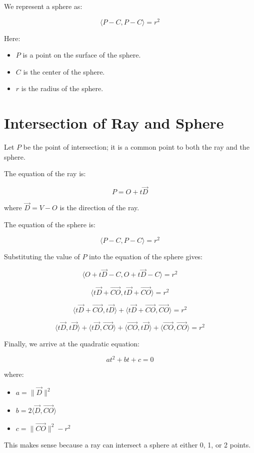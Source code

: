 \documentclass[conference]{IEEEtran}
\begin{document}
We represent a sphere as:

$$\langle P - C, P - C \rangle = r^2$$

Here:
\begin{itemize}
    \item $P$ is a point on the surface of the sphere.
    \item $C$ is the center of the sphere.
    \item $r$ is the radius of the sphere.
\end{itemize}


\section{Intersection of Ray and Sphere}

Let $P$ be the point of intersection; it is a common point to both the ray and the sphere.

The equation of the ray is:

$$P = O + t \vec{D}$$

where $\vec{D} = V - O$ is the direction of the ray.

The equation of the sphere is:

$$\langle P - C, P - C \rangle = r^2$$

Substituting the value of $P$ into the equation of the sphere gives:

$$\langle O + t \vec{D} - C, O + t \vec{D} - C \rangle = r^2$$

$$\langle t \vec{D} + \vec{CO}, t \vec{D} + \vec{CO} \rangle = r^2$$

$$\langle t \vec{D} + \vec{CO}, t \vec{D} \rangle + \langle t \vec{D} + \vec{CO}, \vec{CO} \rangle = r^2$$

$$\langle t \vec{D}, t \vec{D} \rangle + \langle t \vec{D}, \vec{CO} \rangle + \langle \vec{CO}, t \vec{D} \rangle + \langle \vec{CO}, \vec{CO} \rangle = r^2$$

Finally, we arrive at the quadratic equation:

$$at^2 + bt + c = 0$$

where:
\begin{itemize}
    \item $a = \| \vec{D} \|^2$
    \item $b = 2 \langle \vec{D}, \vec{CO} \rangle$
    \item $c = \| \vec{CO} \|^2 - r^2$
\end{itemize}

This makes sense because a ray can intersect a sphere at either 0, 1, or 2 points.
\end{document}
